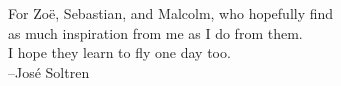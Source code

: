 \documentclass[11pt,twoside,letterpaper,onecolumn]{book}
\newenvironment{dedication}
  {\clearpage           %
   \thispagestyle{empty}%
   \vspace*{\stretch{1}}%
   \itshape             %
   \raggedleft          %
  }
  {\par %
   \vspace{\stretch{3}} %
   \clearpage           %
  }
\begin{document}
\begin{dedication}
For Zo\"e, Sebastian, and Malcolm, who hopefully find\\
as much inspiration from me as I do from them.\\
I hope they learn to fly one day too.\\
--Jos\'e Soltren
\end{dedication}

\pagestyle{fancy}

\fancyhead{} %
\fancyfoot{} %
\fancyfoot[LE,RO]{\thepage}
\fancyfoot[LO,CE]{}
\fancyfoot[CO,RE]{}



%
%



\tableofcontents



\printbibliography
\end{document}
